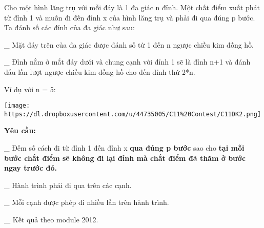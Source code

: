 Cho một hình lăng trụ với mỗi đáy là 1 đa giác n đỉnh. Một chất điểm xuất phát từ đỉnh 1 và muốn đi đến đỉnh x của hình lăng trụ và phải đi qua đúng p bước. Ta đánh số các đỉnh của đa giác như sau:  

   \_ Mặt đáy trên của đa giác được đánh số từ 1 đến n ngược chiều kim đồng hồ.  

   \_ Đỉnh nằm ở mắt đáy dưới và chung cạnh với đỉnh 1 sẽ là đỉnh n+1 và đánh dấu lần lượt ngược chiều kim đồng hồ cho đến đỉnh thứ 2*n.  

   Ví dụ với n = 5:  


\texttt{[image: https://dl.dropboxusercontent.com/u/44735005/C11\%20Contest/C11DK2.png]}

\textbf{    Yêu cầu:   }

   \_ Đếm số cách đi từ đỉnh 1 đến đỉnh x   \textbf{    qua đúng p bước   }   sao cho   \textbf{    tại mỗi bước chất điểm sẽ không đi lại đỉnh mà chất điểm đã thăm ở bước ngay trước đó.   }\textbf{}

   \_ Hành trình phải đi qua trên các cạnh.  

   \_ Mỗi cạnh được phép đi nhiều lần trên hành trình.  

\textbf{    \_   }   Kết quả theo module 2012.